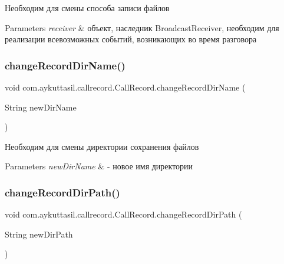 Необходим для смены способа записи файлов 
\begin{DoxyParams}{Parameters}
{\em receiver} & объект, наследник Broadcast\+Receiver, необходим для реализации всевозможных событий, возникающих во время разговора \\
\hline
\end{DoxyParams}
\mbox{\label{classcom_1_1aykuttasil_1_1callrecord_1_1_call_record_a4d821dd8af3aecba6f2618f799099cb9}} 
\subsubsection{\texorpdfstring{change\+Record\+Dir\+Name()}{changeRecordDirName()}}
{\footnotesize\ttfamily void com.\+aykuttasil.\+callrecord.\+Call\+Record.\+change\+Record\+Dir\+Name (\begin{DoxyParamCaption}\item[{String}]{new\+Dir\+Name }\end{DoxyParamCaption})}

Необходим для смены директории сохранения файлов 
\begin{DoxyParams}{Parameters}
{\em new\+Dir\+Name} & -\/ новое имя директории \\
\hline
\end{DoxyParams}
\mbox{\label{classcom_1_1aykuttasil_1_1callrecord_1_1_call_record_a431bf7816cd1f9a635f2eaf7dc9514f2}} 
\subsubsection{\texorpdfstring{change\+Record\+Dir\+Path()}{changeRecordDirPath()}}
{\footnotesize\ttfamily void com.\+aykuttasil.\+callrecord.\+Call\+Record.\+change\+Record\+Dir\+Path (\begin{DoxyParamCaption}\item[{String}]{new\+Dir\+Path }\end{DoxyParamCaption})}

